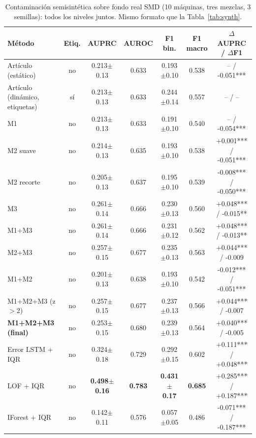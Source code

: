 \begin{table}[t]
\centering\small
\caption{Contaminación semisintética sobre fondo real SMD (10 máquinas, tres mezclas, 3 semillas): todos los niveles juntos. Mismo formato que la Tabla~\ref{tab:synth}.}
\label{tab:semi_all}
\begin{tabular}{lcccccc}
\toprule
Método & Etiq. & AUPRC & AUROC & F1 bin. & F1 macro & $\Delta$AUPRC / $\Delta$F1 \\
\midrule
Artículo (estático) & no & 0.213{\scriptsize$\pm$0.13} & 0.633 & 0.193{\scriptsize$\pm$0.10} & 0.538 & -- / -0.051*** \\
Artículo (dinámico, etiquetas) & sí & 0.213{\scriptsize$\pm$0.13} & 0.633 & 0.244{\scriptsize$\pm$0.14} & 0.557 & -- / -- \\
\midrule
M1 & no & 0.213{\scriptsize$\pm$0.13} & 0.633 & 0.191{\scriptsize$\pm$0.10} & 0.540 & -- / -0.054*** \\
M2 suave & no & 0.214{\scriptsize$\pm$0.13} & 0.635 & 0.193{\scriptsize$\pm$0.10} & 0.538 & +0.001*** / -0.051*** \\
M2 recorte & no & 0.205{\scriptsize$\pm$0.13} & 0.637 & 0.195{\scriptsize$\pm$0.10} & 0.539 & -0.008*** / -0.050*** \\
M3 & no & 0.261{\scriptsize$\pm$0.14} & 0.666 & 0.230{\scriptsize$\pm$0.13} & 0.560 & +0.048*** / -0.015** \\
M1+M3 & no & 0.261{\scriptsize$\pm$0.14} & 0.666 & 0.231{\scriptsize$\pm$0.12} & 0.562 & +0.048*** / -0.013** \\
M2+M3 & no & 0.257{\scriptsize$\pm$0.15} & 0.677 & 0.235{\scriptsize$\pm$0.13} & 0.563 & +0.044*** / -0.009 \\
M1+M2 & no & 0.201{\scriptsize$\pm$0.13} & 0.638 & 0.193{\scriptsize$\pm$0.10} & 0.542 & -0.012*** / -0.051*** \\
\midrule
M1+M2+M3 (z$>$2) & no & 0.257{\scriptsize$\pm$0.15} & 0.677 & 0.237{\scriptsize$\pm$0.13} & 0.566 & +0.044*** / -0.007 \\
\textbf{M1+M2+M3 (final)} & no & 0.253{\scriptsize$\pm$0.15} & 0.680 & 0.239{\scriptsize$\pm$0.13} & 0.564 & +0.040*** / -0.005 \\
\midrule
Error LSTM + IQR & no & 0.324{\scriptsize$\pm$0.18} & 0.729 & 0.292{\scriptsize$\pm$0.15} & 0.602 & +0.111*** / +0.048*** \\
LOF + IQR & no & \textbf{0.498{\scriptsize$\pm$0.16}} & \textbf{0.783} & \textbf{0.431{\scriptsize$\pm$0.17}} & \textbf{0.685} & +0.285*** / +0.187*** \\
IForest + IQR & no & 0.142{\scriptsize$\pm$0.11} & 0.576 & 0.057{\scriptsize$\pm$0.05} & 0.486 & -0.071*** / -0.187*** \\
\bottomrule
\end{tabular}
\end{table}
